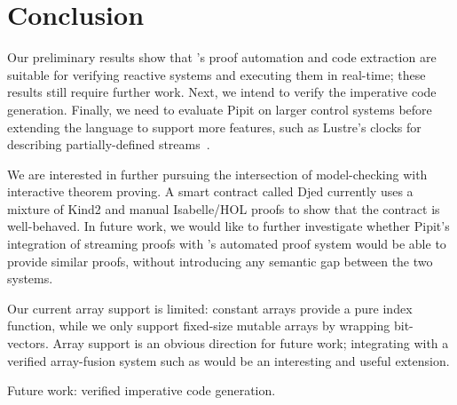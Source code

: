 
\section{Conclusion}

Our preliminary results show that \fstar{}'s proof automation and code extraction are suitable for verifying reactive systems and executing them in real-time; these results still require further work.
Next, we intend to verify the imperative code generation.
Finally, we need to evaluate Pipit on larger control systems before extending the language to support more features, such as Lustre's clocks for describing partially-defined streams~\cite{caspi1995functional}.


We are interested in further pursuing the intersection of model-checking with interactive theorem proving.
A smart contract called Djed \cite{zahnentferner2023djed} currently uses a mixture of Kind2 \cite{champion2016kind2} and manual Isabelle/HOL proofs to show that the contract is well-behaved.
In future work, we would like to further investigate whether Pipit's integration of streaming proofs with \fstar{}'s automated proof system would be able to provide similar proofs, without introducing any semantic gap between the two systems.

Our current array support is limited: constant arrays provide a pure index function, while we only support fixed-size mutable arrays by wrapping bit-vectors.
Array support is an obvious direction for future work; integrating with a verified array-fusion system such as \cite{robinson2017machine} would be an interesting and useful extension.

Future work: verified imperative code generation.